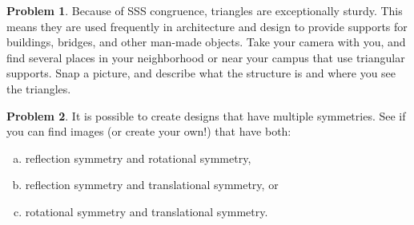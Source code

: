 \documentclass[12pt, reqno]{amsart}
\theoremstyle{remark}
\theoremstyle{definition}
\newtheorem{problem}{Problem}
\numberwithin{equation}{section}  %
\begin{document}
\bigskip

\begin{problem}
Because of SSS congruence, triangles are exceptionally sturdy.  This means they are used frequently in architecture and design to provide supports for buildings, bridges, and other man-made objects.  Take your camera with you, and find several places in your neighborhood or near your campus that use triangular supports.  Snap a picture, and describe what the structure is and where you see the triangles.
\end{problem}



\bigskip

\begin{problem}
It is possible to create designs that have multiple symmetries.  See if you can find images (or create your own!) that have both:
\begin{enumerate}[(a)]
\item
reflection symmetry and rotational symmetry,\\
\item
reflection symmetry and translational symmetry, or\\
\item
rotational symmetry and translational symmetry.
\end{enumerate}

\end{problem}
\end{document}
